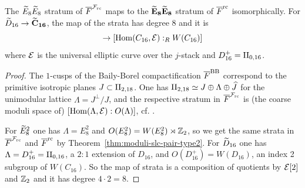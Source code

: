 \documentclass[table,x11names]{amsart}
\begin{document}
\begin{theorem}\label{thm:map-strata-type2}
  The ${\widetilde E}_8{\widetilde E}_8$ stratum of ${\overline F}^{{\mathcal F}_{\rm rc}}$ maps to the
  ${\bf {\widetilde E}_8{\widetilde E}_8}$ stratum of ${\overline F}^{{\rm rc}}$ isomorphically. For
  ${\widetilde D}_{16}\to{\bf {\widetilde C}_{16}}$, the map of the strata has degree 8 and it is
  \begin{displaymath}
    [\Hom(D_{16}^+, \cE) :_R W(D_{16})] \to 
    [\Hom(C_{16}, \cE) :_R W(C_{16})]
  \end{displaymath}
  where ${\mathcal E}$ is the universal elliptic curve over the $j$-stack and
  $D_{16}^+ = \II_{0,16}$.
\end{theorem}
\begin{proof}
  The $1$-cusps of the Baily-Borel compactification ${\overline F}^{\rm BB}$
  correspond to the primitive isotropic planes
  $J\subset\II_{2,18}$. One has
  $\II_{2,18}\simeq J\oplus\Lambda\oplus \hJ$ for the unimodular
  lattice $\Lambda=J^\perp/J$, and the respective stratum in ${\overline F}^{{\mathcal F}_{\rm rc}}$
  is (the coarse moduli space of) $[\operatorname{Hom}(\Lambda,{\mathcal E}) : O(\Lambda)]$,
  cf. \cite{ash1975smooth-compactifications, clingher07on-k3-surfaces}. 
  
  For ${\widetilde E}_8^2$ one has $\Lambda=E_8^2$ and
  $O(E_8^2)=W(E_8^2)\rtimes{\mathbb Z}_2$, so we get the same strata in
  ${\overline F}^{{\mathcal F}_{\rm rc}}$ and ${\overline F}^{{\rm rc}}$ by Theorem~\ref{thm:moduli-slc-pair-type2}.
  For ${\widetilde D}_{16}$ one has $\Lambda = D_{16}^+ = \II_{0,16}$, a $2:1$
  extension of $D_{16}$, and $O(D^+_{16}) = W(D_{16})$, an index 2
  subgroup of $W(C_{16})$. So the map of strata is a composition of
  quotients by ${\mathcal E}[2]$ and ${\mathbb Z}_2$ and it has degree $4\cdot 2=8$.
\end{proof}



%
\end{document}
